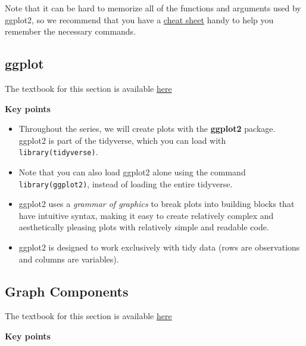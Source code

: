 \documentclass[
]{article}
\providecommand{\tightlist}{%
  \setlength{\itemsep}{0pt}\setlength{\parskip}{0pt}}
\begin{document}
Note that it can be hard to memorize all of the functions and arguments
used by ggplot2, so we recommend that you have a
\href{https://rstudio.com/wp-content/uploads/2015/03/ggplot2-cheatsheet.pdf}{cheat
sheet} handy to help you remember the necessary commands.

\hypertarget{ggplot}{%
\subsection{ggplot}\label{ggplot}}

The textbook for this section is available
\href{https://rafalab.github.io/dsbook/ggplot2.html}{here}

\textbf{Key points}

\begin{itemize}
\tightlist
\item
  Throughout the series, we will create plots with the \textbf{ggplot2}
  package. ggplot2 is part of the tidyverse, which you can load with
  \texttt{library(tidyverse)}.
\item
  Note that you can also load ggplot2 alone using the command
  \texttt{library(ggplot2)}, instead of loading the entire tidyverse.
\item
  ggplot2 uses a \emph{grammar of graphics} to break plots into building
  blocks that have intuitive syntax, making it easy to create relatively
  complex and aesthetically pleasing plots with relatively simple and
  readable code.
\item
  ggplot2 is designed to work exclusively with tidy data (rows are
  observations and columns are variables).
\end{itemize}

\hypertarget{graph-components}{%
\subsection{Graph Components}\label{graph-components}}

The textbook for this section is available
\href{https://rafalab.github.io/dsbook/ggplot2.html\#the-components-of-a-graph}{here}

\textbf{Key points}
\end{document}
